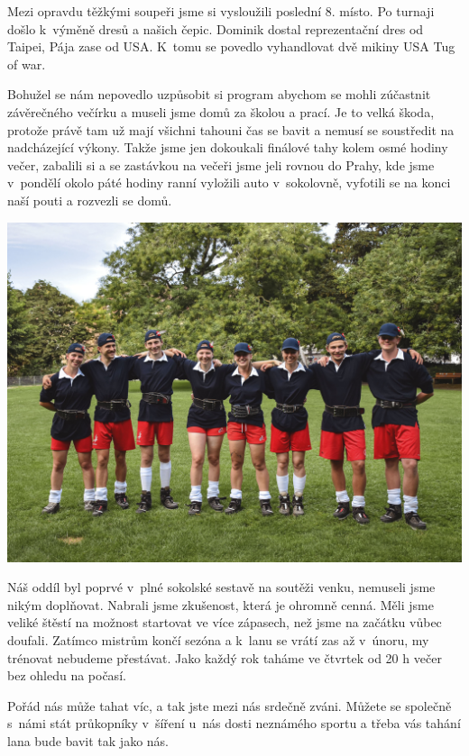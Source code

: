 \documentclass[11pt]{article}
\begin{document}
Mezi opravdu těžkými soupeři jsme si vysloužili poslední 8. místo. Po turnaji došlo k~výměně dresů a našich čepic. Dominik dostal reprezentační dres od Taipei, Pája zase od USA. K~tomu se povedlo vyhandlovat dvě mikiny USA Tug of war.

Bohužel se nám nepovedlo uzpůsobit si program abychom se mohli zúčastnit závěrečného večírku a museli jsme domů za školou a prací. Je to velká škoda, protože právě tam už mají všichni tahouni čas se bavit a nemusí se soustředit na nadcházející výkony. Takže jsme jen dokoukali finálové tahy kolem osmé hodiny večer, zabalili si a se zastávkou na večeři jsme jeli rovnou do Prahy, kde jsme v~pondělí okolo páté hodiny ranní vyložili auto v~sokolovně, vyfotili se na konci naší pouti a rozvezli se domů.

\begin{center}
  \includegraphics[width=\linewidth]{./lano-team-2.jpg}
\end{center}

Náš oddíl byl poprvé v~plné sokolské sestavě na soutěži venku, nemuseli jsme nikým doplňovat. Nabrali jsme zkušenost, která je ohromně cenná. Měli jsme veliké štěstí na možnost startovat ve více zápasech, než jsme na začátku vůbec doufali. Zatímco mistrům končí sezóna a k~lanu se vrátí zas až v~únoru, my trénovat nebudeme přestávat. Jako každý rok taháme ve čtvrtek od 20 h večer bez ohledu na počasí. 

Pořád nás může tahat víc, a tak jste mezi nás srdečně zváni. Můžete se společně s~námi stát průkopníky v~šíření u~nás dosti neznámého sportu a třeba vás tahání lana bude bavit tak jako nás.
\end{document}
